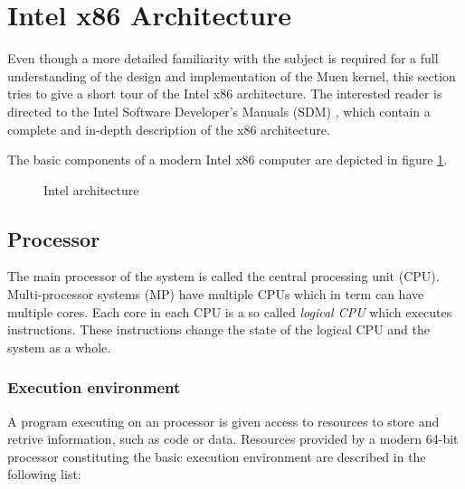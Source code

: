\section{Intel x86 Architecture}
Even though a more detailed familiarity with the subject is required for a full
understanding of the design and implementation of the Muen kernel, this section
tries to give a short tour of the Intel x86 architecture. The interested reader
is directed to the Intel Software Developer's Manuals (SDM)
\cite{IntelSDM}, which contain a complete and in-depth description of the x86
architecture.

The basic components of a modern Intel x86 computer are depicted in figure
\ref{fig:intel-architecture}.

\begin{figure}[h]
	\centering
	
	\caption{Intel architecture}
	\label{fig:intel-architecture}
\end{figure}

\subsection{Processor}
The main processor of the system is called the central processing unit
(CPU). Multi-processor systems (MP) have multiple CPUs
which in term can have multiple cores. Each core in each CPU is a so called
\emph{logical CPU} which executes instructions. These instructions change the
state of the logical CPU and the system as a whole.

\subsubsection{Execution environment}\label{subsubsec:exec-env}
A program executing on an processor is given access to resources to store and
retrive information, such as code or data. Resources provided by a modern
64-bit processor constituting the basic execution environment are described in
the following list:

